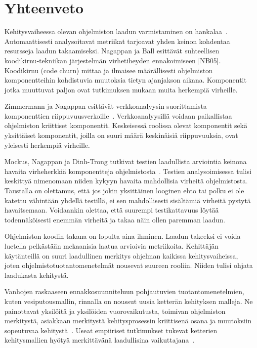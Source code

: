 \documentclass[finnish]{../tktltiki2}
\theoremstyle{definition}
\theoremstyle{remark}
\begin{document}
\section{Yhteenveto}

Kehitysvaiheessa olevan ohjelmiston laadun varmistaminen on hankalaa~\cite{NB05, NB07, ZN08, MNDT09}. Automaattisesti 
analysoitavat metriikat tarjoavat yhden keinon kohdentaa resursseja laadun takaamiseksi. Nagappan ja Ball esittävät 
suhteellisen koodikirnu-tekniikan järjestelmän virhetiheyden ennakoimiseen [NB05]. Koodikirnu (code churn) mittaa ja 
ilmaisee määrällisesti ohjelmiston komponentteihin kohdistuvia muutoksia tietyn ajanjakson aikana. Komponentit jotka 
muuttuvat paljon ovat tutkimuksen mukaan muita herkempiä virheille.

    Zimmermann ja Nagappan esittävät verkkoanalyysin suorittamista komponenttien riippuvuusverkoille~\cite{ZN08}. 
Verkkoanalyysillä voidaan paikallistaa ohjelmiston kriittiset komponentit. Keskeisessä roolissa olevat komponentit sekä 
yksittäiset komponentit, joilla on suuri määrä keskinäisiä riippuvuuksia, ovat yleisesti herkempiä virheille.

    Mockus, Nagappan ja Dinh-Trong tutkivat testien laadullista arviointia keinona havaita virheherkkiä komponentteja 
ohjelmistosta~\cite{MNDT09}. Testien analysoimisessa tulisi keskittyä nimenomaan niiden kykyyn havaita mahdollisia 
virheitä ohjelmistosta. Taustalla on olettamus, että jos jokin yksittäinen looginen ehto tai polku ei ole katettu 
vähintään yhdellä testillä, ei sen mahdollisesti sisältämiä virheitä pystytä havaitsemaan. Voidaankin olettaa, että 
suurempi testikattavuus löytää todennäköisesti enemmän virheitä ja takaa näin ollen paremman laadun.

    Ohjelmiston koodin takana on lopulta aina ihminen.  Laadun takeeksi ei voida luetella pelkästään mekaanisia laatua 
arvioivia metriikoita. Kehittäjän käytänteillä on suuri laadullinen merkitys ohjelman kaikissa kehitysvaiheissa, joten 
ohjelmistotuotantomenetelmät nousevat suureen rooliin. Niiden tulisi ohjata laadukasta kehitystä.

    Vanhojen raskaaseen ennakkosuunniteluun pohjautuvien tuotantomenetelmien, kuten vesiputousmallin, rinnalla on 
noussut uusia ketterän kehityksen malleja. Ne painottavat yksilöitä ja yksilöiden vuorovaikutusta, toimivan ohjelmiston 
merkitystä, asiakkaan merkitystä kehitysprosessin kriittisenä osana ja muutoksiin sopeutuvaa kehitystä~\cite{BBB01}. 
Useat empiiriset tutkimukset tukevat ketterien kehitysmallien hyötyä merkittävänä laadullisina vaikuttajana~\cite{SS10}. 

\newpage




\end{document}
